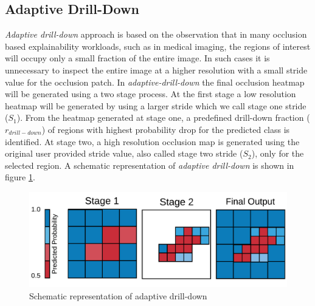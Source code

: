 \subsection{Adaptive Drill-Down}\label{sec:ada-drill-down}
\textit{Adaptive drill-down} approach is based on the observation that in many occlusion based explainability workloads, such as in medical imaging, the regions of interest will occupy only a small fraction of the entire image.
In such cases it is unnecessary to inspect the entire image at a higher resolution with a small stride value for the occlusion patch.
In \textit{adaptive-drill-down} the final occlusion heatmap will be generated using a two stage process. At the first stage a low resolution heatmap will be generated by using a larger stride which we call stage one stride ($S_1$). From the heatmap generated at stage one, a predefined drill-down fraction ($r_{drill-down}$) of regions with highest probability drop for the predicted class is identified. At stage two, a high resolution occlusion map is generated using the original user provided stride value, also called stage two stride ($S_2$), only for the selected region. A schematic representation of \textit{adaptive drill-down} is shown in figure \ref{fig:adaptive-drill-down}.

\begin{figure}[t]
\includegraphics[width=\columnwidth]{images/adaptive-drill-down}
\caption{Schematic representation of adaptive drill-down}
\label{fig:adaptive-drill-down}
\end{figure}

